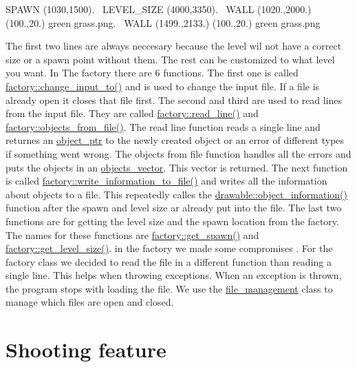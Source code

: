 S\+P\+A\+WN (1030,1500).~\newline
 L\+E\+V\+E\+L\+\_\+\+S\+I\+ZE (4000,3350).~\newline
 W\+A\+LL (1020.,2000.) (100.,20.) green grass.\+png.~\newline
 W\+A\+LL (1499.,2133.) (100.,20.) green grass.\+png

The first two lines are always neccesary because the level wil not have a correct size or a spawn point without them. The rest can be customized to what level you want. In The factory there are 6 functions. The first one is called \hyperlink{classfactory_a9e164a8fbb65188de99c39d55d7cc384}{factory\+::change\+\_\+input\+\_\+to()} and is used to change the input file. If a file is already open it closes that file first. The second and third are used to read lines from the input file. They are called \hyperlink{classfactory_a82385866bc910c1b3a3e82d56487dd24}{factory\+::read\+\_\+line()} and \hyperlink{classfactory_afb2fad4ac9b0f39b1bfc3f3fc8d218b6}{factory\+::objects\+\_\+from\+\_\+file()}. The read line function reads a single line and returnes an \hyperlink{typedefs_8hpp_aab5add95f06d2ba25dbfed8eb07274fa}{object\+\_\+ptr} to the newly created object or an error of different types if something went wrong. The objects from file function handles all the errors and puts the objects in an \hyperlink{typedefs_8hpp_a6c0fdb1dfd0c34dbbdbb5dcd3c608b07}{objects\+\_\+vector}. This vector is returned. The next function is called \hyperlink{classfactory_af17f2a44d75cf8ccf712384341c2fcde}{factory\+::write\+\_\+information\+\_\+to\+\_\+file()} and writes all the information about objects to a file. This repeatedly calles the \hyperlink{classdrawable_a2ed0f8bb53f33477f7722efa7bb24583}{drawable\+::object\+\_\+information()} function after the spawn and level size ar already put into the file. The last two functions are for getting the level size and the spawn location from the factory. The names for these functions are \hyperlink{classfactory_a3c3a039b8f76a947267dbe659166550b}{factory\+::get\+\_\+spawn()} and \hyperlink{classfactory_af9bb026273b34fc032ca5ac73d457611}{factory\+::get\+\_\+level\+\_\+size()}. in the factory we made some compromises . For the factory class we decided to read the file in a different function than reading a single line. This helps when throwing exceptions. When an exception is thrown, the program stops with loading the file. We use the \hyperlink{classfile__management}{file\+\_\+management} class to manage which files are open and closed.\hypertarget{index_bullet}{}\section{Shooting feature}\label{index_bullet}

